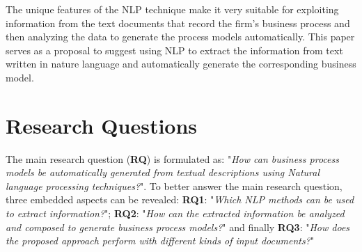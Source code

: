 	The unique features of the NLP technique make it very suitable for exploiting information from the text documents that record the firm's business process and then analyzing the data to generate the process models automatically. This paper serves as a proposal to suggest using NLP to extract the information from text written in nature language and automatically generate the corresponding business model.
	
	\section{Research Questions}

	The main research question (\textbf{RQ}) is formulated as: "\textit{How can business process models be automatically generated from textual descriptions using Natural language processing techniques?}". To better answer the main research question, three embedded aspects can be revealed: \textbf{RQ1}: "\textit{Which NLP methods can be used to extract information?}"; \textbf{RQ2}: "\textit{How can the extracted information be analyzed and composed to generate business process models?}" and finally \textbf{RQ3}: "\textit{How does the proposed approach perform with different kinds of input documents?}"

